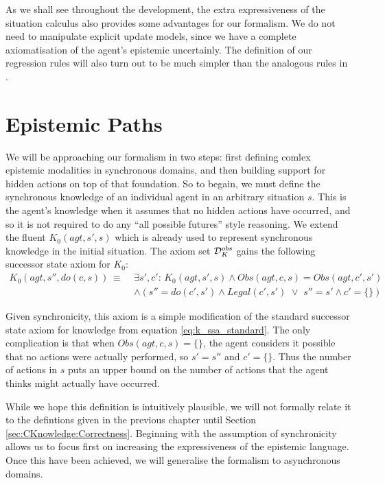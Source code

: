 As we shall see throughout the development, the extra expressiveness
of the situation calculus also provides some advantages for our formalism.
We do not need to manipulate explicit update models, since we have
a complete axiomatisation of the agent's epistemic uncertainly. The
definition of our regression rules will also turn out to be much simpler
than the analogous rules in \citep{vanBenthem06lcc}.


\section{Epistemic Paths\label{sec:CKnowledge:Epistemic-Paths}}

We will be approaching our formalism in two steps: first defining
comlex epistemic modalities in synchronous domains, and then building
support for hidden actions on top of that foundation. So to begain,
we must define the synchronous knowledge of an individual agent in
an arbitrary situation $s$. This is the agent's knowledge when it
assumes that no hidden actions have occurred, and so it is not required
to do any {}``all possible futures'' style reasoning. We extend
the fluent $K_{0}(agt,s',s)$ which is already used to represent synchronous
knowledge in the initial situation. The axiom set $\mathcal{D}_{K}^{obs}$
gains the following successor state axiom for $K_{0}$:\begin{align}
K_{0}(agt,s'',do(c,s))\,\equiv\,\, & \exists s',c':\, K_{0}(agt,s',s)\wedge Obs(agt,c,s)=Obs(agt,c',s')\nonumber \\
 & \wedge\left(s''=do(c',s')\wedge Legal(c',s')\,\,\vee\,\, s''=s'\wedge c'=\{\}\right)\label{eq:K0_ssa}\end{align}


Given synchronicity, this axiom is a simple modification of the standard
successor state axiom for knowledge from equation \eqref{eq:k_ssa_standard}.
The only complication is that when $Obs(agt,c,s)=\{\}$, the agent
considers it possible that no actions were actually performed, so
$s'=s''$ and $c'=\{\}$. Thus the number of actions in $s$ puts
an upper bound on the number of actions that the agent thinks might
actually have occurred.

While we hope this definition is intuitively plausible, we will not
formally relate it to the defintions given in the previous chapter
until Section \eqref{sec:CKnowledge:Correctness}. Beginning with
the assumption of synchronicity allows us to focus first on increasing
the expressiveness of the epistemic language. Once this have been
achieved, we will generalise the formalism to asynchronous domains.

